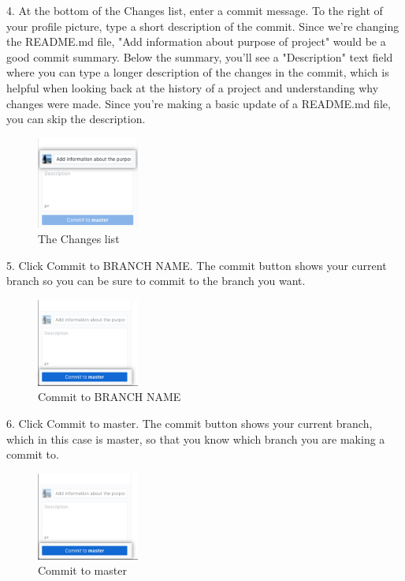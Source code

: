 4.	At the bottom of the Changes list, enter a commit message. To the right of your profile picture, type a short description of the commit. Since we're changing the README.md file, "Add information about purpose of project" would be a good commit summary. Below the summary, you'll see a "Description" text field where you can type a longer description of the changes in the commit, which is helpful when looking back at the history of a project and understanding why changes were made. Since you're making a basic update of a README.md file, you can skip the description.
\begin{figure}[ht]
    \centering
    \includegraphics[width=0.3\textwidth]{figures/The Changes list.png}
    \caption{The Changes list}
\end{figure}

5.	Click Commit to BRANCH NAME. The commit button shows your current branch so you can be sure to commit to the branch you want.
\begin{figure}[ht]
    \centering
    \includegraphics[width=0.3\textwidth]{figures/Commit to BRANCH NAME.png}
    \caption{Commit to BRANCH NAME}
\end{figure}
6.	Click Commit to master. The commit button shows your current branch, which in this case is master, so that you know which branch you are making a commit to.

\begin{figure}[ht]
    \centering
    \includegraphics[width=0.3\textwidth]{figures/Commit to master.png}
    \caption{Commit to master}
\end{figure}


